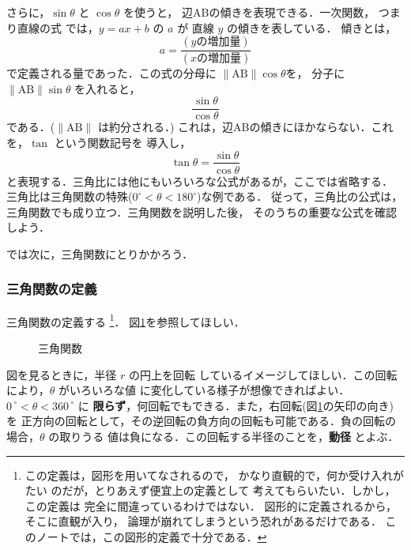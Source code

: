     さらに，$\sin \theta$ と $\cos \theta$ を使うと，
    辺ABの傾きを表現できる．一次関数，
    つまり直線の式
    では，$y=ax+b$ の $a$ が
    直線 $y$ の傾きを表している．
    傾きとは，
        \begin{equation*}
            a=\frac{(y\mbox{の増加量})}{(x\mbox{の増加量})}
        \end{equation*}
    で定義される量であった．この式の分母に $\|\mathrm{AB}\|\cos\theta$を，
    分子に $\|\mathrm{AB}\|\sin\theta$ を入れると，
        \begin{equation*}
            \frac{\sin\theta}{\cos\theta}
        \end{equation*}
    である．($\|\mathrm{AB}\|$ は約分される．)
    これは，辺ABの傾きにほかならない．これを，$\tan$ という関数記号を
    導入し，
        \begin{equation*}
            \tan\theta =\frac{\sin\theta}{\cos\theta}
        \end{equation*}
    と表現する．三角比には他にもいろいろな公式があるが，ここでは省略する．
    三角比は三角関数の特殊($0^{\circ}< \theta <180^{\circ}$)な例である．
    従って，三角比の公式は，三角関数でも成り立つ．三角関数を説明した後，
    そのうちの重要な公式を確認しよう．

    では次に，三角関数にとりかかろう．

\subsubsection{三角関数の定義}
    三角関数の定義する
        \footnote{
            この定義は，図形を用いてなされるので，
            かなり直観的で，何か受け入れがたい
            のだが，とりあえず便宜上の定義として
            考えてもらいたい．しかし，この定義は
            完全に間違っているわけではない．
            図形的に定義されるから，そこに直観が入り，
            論理が崩れてしまうという恐れがあるだけである．
            このノートでは，この図形的定義で十分である．
        }．
    図\ref{fig:sankakukansu1}を参照してほしい．
        \begin{figure}[hbt]
            \begin{center}
                \caption{三角関数}
                \label{fig:sankakukansu1}
            \end{center}
        \end{figure}

    図を見るときに，半径 $r$ の円上を回転
    しているイメージしてほしい．この回転により，$\theta$ がいろいろな値
    に変化している様子が想像できればよい．${0\,}^{\circ} < \theta < {360\,}^{\circ}$ に
    \textbf{限らず}，何回転でもできる．また，右回転(図\ref{fig:sankakukansu1}の矢印の向き)を
    正方向の回転として，その逆回転の負方向の回転も可能である．負の回転の場合，$\theta$ の取りうる
    値は負になる．この回転する半径のことを，\textbf{動径} とよぶ．\\

